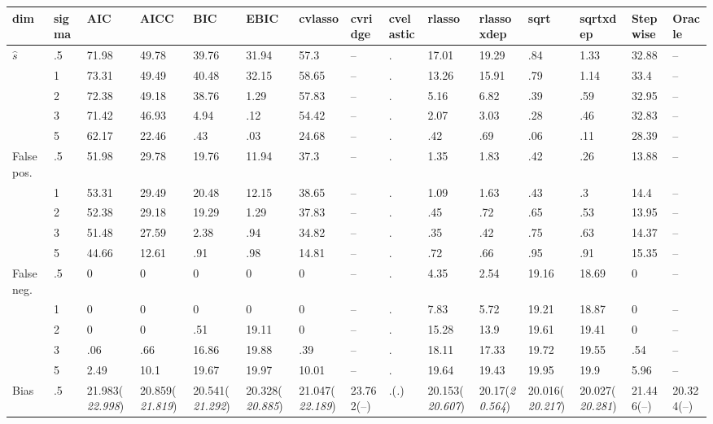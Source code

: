 \documentclass{article}
\begin{document}
\begin{table}[tbp] \centering
{}

{\tiny
\begin{tabularx}{\textwidth}{lCCCCCCCCCCCCCC}

\toprule
{dim}&{sigma}&{AIC}&{AICC}&{BIC}&{EBIC}&{cvlasso}&{cvridge}&{cvelastic}&{rlasso}&{rlassoxdep}&{sqrt}&{sqrtxdep}&{Stepwise}&{Oracle} \tabularnewline
\midrule\addlinespace[1.5ex]
$\hat{s}$&.5&71.98&49.78&39.76&31.94&57.3&--&.&17.01&19.29&.84&1.33&32.88&-- \tabularnewline
&1&73.31&49.49&40.48&32.15&58.65&--&.&13.26&15.91&.79&1.14&33.4&-- \tabularnewline
&2&72.38&49.18&38.76&1.29&57.83&--&.&5.16&6.82&.39&.59&32.95&-- \tabularnewline
&3&71.42&46.93&4.94&.12&54.42&--&.&2.07&3.03&.28&.46&32.83&-- \tabularnewline
&5&62.17&22.46&.43&.03&24.68&--&.&.42&.69&.06&.11&28.39&-- \tabularnewline
\midrule False pos.&.5&51.98&29.78&19.76&11.94&37.3&--&.&1.35&1.83&.42&.26&13.88&-- \tabularnewline
&1&53.31&29.49&20.48&12.15&38.65&--&.&1.09&1.63&.43&.3&14.4&-- \tabularnewline
&2&52.38&29.18&19.29&1.29&37.83&--&.&.45&.72&.65&.53&13.95&-- \tabularnewline
&3&51.48&27.59&2.38&.94&34.82&--&.&.35&.42&.75&.63&14.37&-- \tabularnewline
&5&44.66&12.61&.91&.98&14.81&--&.&.72&.66&.95&.91&15.35&-- \tabularnewline
\midrule False neg.&.5&0&0&0&0&0&--&.&4.35&2.54&19.16&18.69&0&-- \tabularnewline
&1&0&0&0&0&0&--&.&7.83&5.72&19.21&18.87&0&-- \tabularnewline
&2&0&0&.51&19.11&0&--&.&15.28&13.9&19.61&19.41&0&-- \tabularnewline
&3&.06&.66&16.86&19.88&.39&--&.&18.11&17.33&19.72&19.55&.54&-- \tabularnewline
&5&2.49&10.1&19.67&19.97&10.01&--&.&19.64&19.43&19.95&19.9&5.96&-- \tabularnewline
\midrule Bias&.5&21.983\newline (\emph{22.998})&20.859\newline (\emph{21.819})&20.541\newline (\emph{21.292})&20.328\newline (\emph{20.885})&21.047\newline (\emph{22.189})&23.762\newline (--)&.\newline (\emph{.})&20.153\newline (\emph{20.607})&20.17\newline (\emph{20.564})&20.016\newline (\emph{20.217})&20.027\newline (\emph{20.281})&21.446\newline (--)&20.324\newline (--) \tabularnewline

\end{tabularx}}
\end{table}
\end{document}

